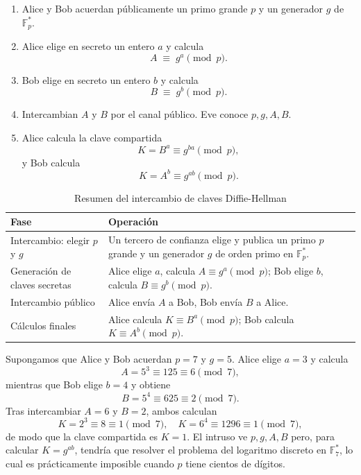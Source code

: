 \begin{enumerate}
  \item Alice y Bob acuerdan públicamente un primo grande \(p\) y un generador \(g\) de \(\mathbb{F}_p^*\).  
  \item Alice elige en secreto un entero \(a\) y calcula
    \[
      A \;\equiv\; g^a \pmod p.
    \]
  \item Bob elige en secreto un entero \(b\) y calcula
    \[
      B \;\equiv\; g^b \pmod p.
    \]
  \item Intercambian \(A\) y \(B\) por el canal público. Eve conoce \(p,g,A,B\).  
  \item Alice calcula la clave compartida
    \[
      K = B^a \equiv g^{ba} \pmod p,
    \]
    y Bob calcula
    \[
      K = A^b \equiv g^{ab} \pmod p.
    \]
\end{enumerate}

\begin{table}[H]
  \centering
  \begin{tabular}{p{4cm}p{8cm}}
    \toprule
    \textbf{Fase} & \textbf{Operación} \\
    \midrule
    Intercambio: elegir $p$ y $g$ & Un tercero de confianza elige y publica un primo \(p\) grande y un generador \(g\) de orden primo en \(\mathbb{F}_p^*\). \\
    Generación de claves secretas  & Alice elige \(a\), calcula \(A\equiv g^a\pmod p\); Bob elige \(b\), calcula \(B\equiv g^b\pmod p\). \\
    Intercambio público & Alice envía \(A\) a Bob, Bob envía \(B\) a Alice. \\
    Cálculos finales    & Alice calcula \(K\equiv B^a\pmod p\); Bob calcula \(K\equiv A^b\pmod p\). \\
    \bottomrule
  \end{tabular}
  \caption{Resumen del intercambio de claves Diffie-Hellman}
  \label{tab:dh-algoritmo}
\end{table}

\begin{ejemplo}
Supongamos que Alice y Bob acuerdan \(p=7\) y \(g=5\).  
Alice elige \(a=3\) y calcula
\[
  A = 5^3 \equiv 125 \equiv 6 \pmod 7,
\]
mientras que Bob elige \(b=4\) y obtiene
\[
  B = 5^4 \equiv 625 \equiv 2 \pmod 7.
\]
Tras intercambiar \(A=6\) y \(B=2\), ambos calculan
\[
  K = 2^3 \equiv 8 \equiv 1 \pmod 7,
  \quad
  K = 6^4 \equiv 1296 \equiv 1 \pmod 7,
\]
de modo que la clave compartida es \(K=1\).  
El intruso ve \(p,g,A,B\) pero, para calcular \(K=g^{ab}\), tendría que resolver el problema del logaritmo discreto en \(\mathbb{F}_7^*\), lo cual es prácticamente imposible cuando \(p\) tiene cientos de dígitos.
\end{ejemplo}

